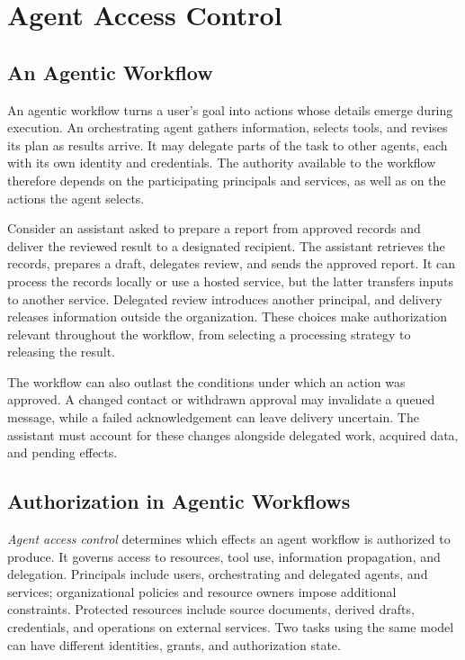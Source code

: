 \section{Agent Access Control}\label{sec:background}
\subsection{An Agentic Workflow}
An agentic workflow turns a user's goal into actions whose details emerge during execution. An orchestrating agent gathers information, selects tools, and revises its plan as results arrive. It may delegate parts of the task to other agents, each with its own identity and credentials. The authority available to the workflow therefore depends on the participating principals and services, as well as on the actions the agent selects.

Consider an assistant asked to prepare a report from approved records and deliver the reviewed result to a designated recipient. The assistant retrieves the records, prepares a draft, delegates review, and sends the approved report. It can process the records locally or use a hosted service, but the latter transfers inputs to another service. Delegated review introduces another principal, and delivery releases information outside the organization. These choices make authorization relevant throughout the workflow, from selecting a processing strategy to releasing the result.

The workflow can also outlast the conditions under which an action was approved. A changed contact or withdrawn approval may invalidate a queued message, while a failed acknowledgement can leave delivery uncertain. The assistant must account for these changes alongside delegated work, acquired data, and pending effects.

\subsection{Authorization in Agentic Workflows}
\emph{Agent access control} determines which effects an agent workflow is authorized to produce. It governs access to resources, tool use, information propagation, and delegation. Principals include users, orchestrating and delegated agents, and services; organizational policies and resource owners impose additional constraints. Protected resources include source documents, derived drafts, credentials, and operations on external services. Two tasks using the same model can have different identities, grants, and authorization state.

